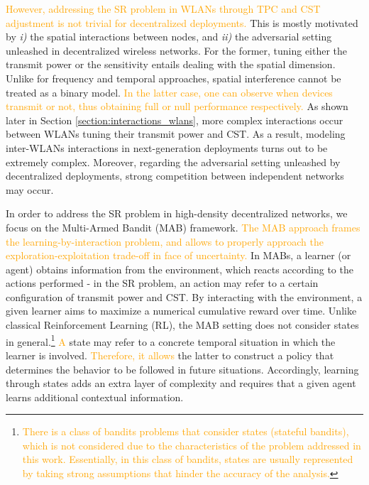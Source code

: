 \documentclass[preprint,12pt]{elsarticle}
\begin{document}
\textcolor{orange}{However, addressing the SR problem in WLANs through TPC and CST adjustment is not trivial for decentralized deployments.} This is mostly motivated by \emph{i)} the spatial interactions between nodes, and \emph{ii)} the adversarial setting unleashed in decentralized wireless networks. For the former, tuning either the transmit power or the sensitivity entails dealing with the spatial dimension. Unlike for frequency and temporal approaches, spatial interference cannot be treated as a binary model. \textcolor{orange}{In the latter case, one can observe when devices transmit or not, thus obtaining full or null performance respectively.} As shown later in Section \ref{section:interactions_wlans}, more complex interactions occur between WLANs tuning their transmit power and CST. As a result, modeling inter-WLANs interactions in next-generation deployments turns out to be extremely complex. 
Moreover, regarding the adversarial setting unleashed by decentralized deployments, strong competition between independent networks may occur. 

In order to address the SR problem in high-density decentralized networks, we focus on the Multi-Armed Bandit (MAB) framework. \textcolor{orange}{The MAB approach frames the learning-by-interaction problem, and allows to properly approach the exploration-exploitation trade-off in face of uncertainty.} In MABs, a learner (or agent) obtains information from the environment, which reacts according to the actions performed - in the SR problem, an action may refer to a certain configuration of transmit power and CST. By interacting with the environment, a given learner aims to maximize a numerical cumulative reward over time. Unlike classical Reinforcement Learning (RL), the MAB setting does not consider states in general.\footnote{\textcolor{orange}{There is a class of bandits problems that consider states (stateful bandits), which is not considered due to the characteristics of the problem addressed in this work. Essentially, in this class of bandits, states are usually represented by taking strong assumptions that hinder the accuracy of the analysis.}} \textcolor{orange}{A} state may refer to a concrete temporal situation in which the learner is involved. \textcolor{orange}{Therefore, it allows} the latter to construct a policy that determines the behavior to be followed in future situations. Accordingly, learning through states adds an extra layer of complexity and requires that a given agent learns additional contextual information.
\end{document}
